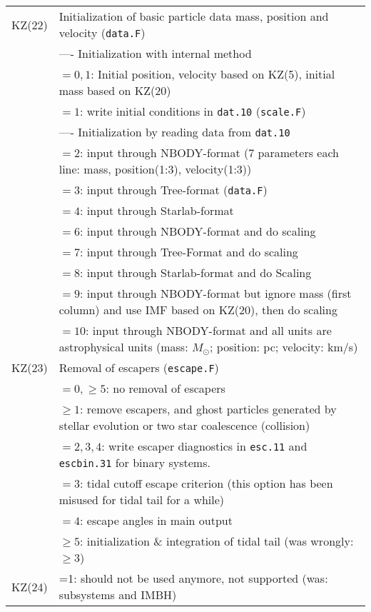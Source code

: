 \begin{longtable}{@{}p{1.5cm}p{13.0cm}}
KZ(22)  & Initialization of basic particle data mass, position and velocity (\texttt{data.F}) \\
        & ---- Initialization with internal method \\
        & $=0,1$: Initial position, velocity based on KZ(5), initial mass based on KZ(20) \\
        & $=1$: write initial conditions in \texttt{dat.10} (\texttt{scale.F}) \\
        & ---- Initialization by reading data from \texttt{dat.10} \\
        & $=2$: input through NBODY-format (7 parameters each line: mass, position(1:3), velocity(1:3))\\
        & $=3$: input through Tree-format (\texttt{data.F}) \\
        & $=4$: input through Starlab-format \\
        & $=6$: input through NBODY-format and do scaling\\
        & $=7$: input through Tree-Format and do scaling\\
        & $=8$: input through Starlab-format and do Scaling\\
        & $=9$: input through NBODY-format but ignore mass (first column) and use IMF based on KZ(20), then do scaling \\
        & $=10$: input through NBODY-format and all units are astrophysical units (mass: $M_\odot$; position: pc; velocity: km/s)\\
KZ(23)  & Removal of escapers (\texttt{escape.F})\\
        & $= 0, \ge 5$: no removal of escapers \\ 
        & $\ge 1$: remove escapers, and ghost particles generated by stellar evolution or two star coalescence (collision) \\
        & $=2,3,4$: write escaper diagnostics in \texttt{esc.11} and \texttt{escbin.31} for binary systems. \\
        & $=3$: tidal cutoff escape criterion (this option has been misused for tidal tail for a while) \\
        & $=4$: escape angles in main output \\
        & $\ge 5$: initialization \& integration of tidal tail (was wrongly: $\ge 3$)\\
KZ(24)  & =1: should not be used anymore, not supported (was: subsystems and IMBH)\\

\end{longtable}
